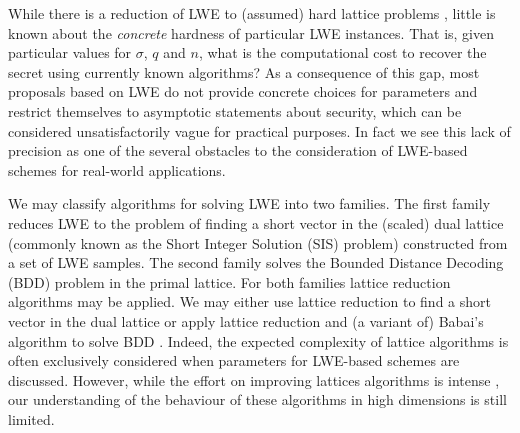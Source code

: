  While there is a reduction of LWE to (assumed) hard lattice problems \cite{regev:acm09}, little is known about the \emph{concrete} hardness of particular LWE instances. That is, given particular values for $\sigma$, $q$ and $n$, what is the computational cost to recover the secret using currently known algorithms? As a consequence of this gap, most proposals based on LWE do not provide  concrete choices for parameters and restrict themselves to asymptotic statements about security, which can be considered unsatisfactorily vague for practical purposes. In fact we see this lack of precision as one of the several obstacles to the consideration of LWE-based schemes for real-world applications.

 We may classify algorithms for solving LWE into two families. The first family reduces LWE to the problem of finding a short vector in the (scaled) dual lattice (commonly known as the Short Integer Solution (SIS) problem) constructed from a set of LWE samples. The second family solves the Bounded Distance Decoding (BDD) problem in the primal lattice. For both families lattice reduction algorithms may be applied. We may either use lattice reduction to find a short vector in the dual lattice or apply lattice reduction and (a variant of) Babai's algorithm to solve BDD \cite{LindnerP10}. Indeed, the expected complexity of lattice algorithms is often exclusively considered when parameters for LWE-based schemes are discussed. However, while the effort on improving lattices algorithms is intense \cite{rueckert-schneider:eprint2010,chen-nguyen:asiacrypt2011,nguyen:eurocrypt2011,gama-nguyen-regev:eurocrypt2010,nguyen-stehle:talgs2009,hanrot-pujol-stehle:crypto2011,DBLP:conf/issac/MorelSV09,DBLP:journals/iacr/PujolS09}, our understanding of the behaviour of these algorithms in high dimensions is still limited. 

